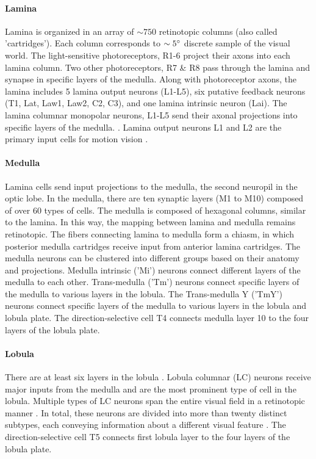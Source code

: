 \paragraph{Lamina}
Lamina is organized in an array of $\sim 750$ retinotopic columns (also called 'cartridges'). Each column corresponds to $\sim 5\degree$ discrete sample of the visual world. The light-sensitive photoreceptors, R1-6 project their axons into each lamina column. Two other photoreceptors, R7 \& R8 pass through the lamina and synapse in specific layers of the medulla. Along with photoreceptor axons, the lamina includes 5 lamina output neurons (L1-L5), six putative feedback neurons (T1, Lat, Law1, Law2, C2, C3), and one lamina intrinsic neuron (Lai). The lamina columnar monopolar neurons, L1-L5 send their axonal projections into specific layers of the medulla. \parencite{Fischbach1989, Tuthill2013}. Lamina output neurons L1 and L2 are the primary input cells for motion vision \parencite{Zhu2013}.


\paragraph{Medulla}
Lamina cells send input projections to the medulla, the second neuropil in the optic lobe. In the medulla, there are ten synaptic layers (M1 to M10) composed of over 60 types of cells. The medulla is composed of hexagonal columns, similar to the lamina. In this way, the mapping between lamina and medulla remains retinotopic. The fibers connecting lamina to medulla form a chiasm, in which posterior medulla cartridges receive input from anterior lamina cartridges. The medulla neurons can be clustered into different groups based on their anatomy and projections. Medulla intrinsic ('Mi') neurons connect different layers of the medulla to each other. Trans-medulla ('Tm') neurons connect specific layers of the medulla to various layers in the lobula. The Trans-medulla Y ('TmY') neurons connect specific layers of the medulla to various layers in the lobula and lobula plate. The direction-selective cell T4 connects medulla layer 10 to the four layers of the lobula plate.

\paragraph{Lobula}
There are at least six layers in the lobula \parencite{Fischbach1989}. Lobula columnar (LC) neurons receive major inputs from the medulla and are the most prominent type of cell in the lobula. Multiple types of LC neurons span the entire visual field in a retinotopic manner \parencite{Otsuna2006}. In total, these neurons are divided into more than twenty distinct subtypes, each conveying information about a different visual feature \parencite{Wu2016}. The direction-selective cell T5 connects first lobula layer to the four layers of the lobula plate.

